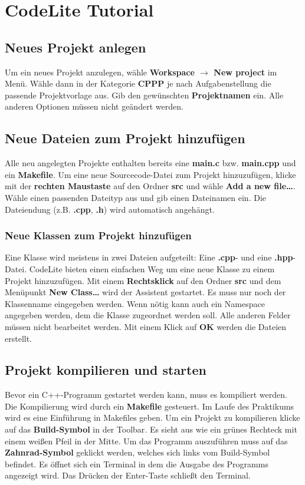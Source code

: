 \section{\ExercisePrefixAdditionalInformation CodeLite Tutorial}

\subsection{Neues Projekt anlegen}
Um ein neues Projekt anzulegen, wähle \textbf{Workspace $\rightarrow$ New project} im Menü. Wähle dann in der Kategorie \textbf{CPPP} je nach Aufgabenstellung die passende Projektvorlage aus.
Gib den gewünschten \textbf{Projektnamen} ein. Alle anderen Optionen müssen nicht geändert werden.

\subsection{Neue Dateien zum Projekt hinzufügen}
Alle neu angelegten Projekte enthalten bereits eine \textbf{main.c} bzw. \textbf{main.cpp} und ein \textbf{Makefile}.
Um eine neue Sourcecode-Datei zum Projekt hinzuzufügen, klicke mit der \textbf{rechten Maustaste} auf den Ordner \textbf{src} und wähle \textbf{Add a new file\dots}.
Wähle einen passenden Dateityp aus und gib einen Dateinamen ein.
Die Dateiendung (z.B. \textbf{.cpp}, \textbf{.h}) wird automatisch angehängt.

\subsubsection{Neue Klassen zum Projekt hinzufügen}
Eine Klasse wird meistens in zwei Dateien aufgeteilt: Eine \textbf{.cpp}- und eine \textbf{.hpp}-Datei. CodeLite bieten einen einfachen Weg um eine neue Klasse zu einem Projekt hinzuzufügen. Mit einem \textbf{Rechtsklick} auf den Ordner \textbf{src} und dem Menüpunkt \textbf{New Class\dots} wird der Assistent gestartet. Es muss nur noch der Klassenname eingegeben werden. Wenn nötig kann auch ein Namespace angegeben werden, dem die Klasse zugeordnet werden soll. Alle anderen Felder müssen nicht bearbeitet werden. Mit einem Klick auf \textbf{OK} werden die Dateien erstellt.


\subsection{Projekt kompilieren und starten}
Bevor ein C++-Programm gestartet werden kann, muss es kompiliert werden.
Die Kompilierung wird durch ein \textbf{Makefile} gesteuert. Im Laufe des Praktikums wird es eine Einführung in Makefiles geben.
Um ein Projekt zu kompilieren klicke auf das \textbf{Build-Symbol} in der Toolbar. Es sieht aus wie ein grünes Rechteck mit einem weißen Pfeil in der Mitte.
Um das Programm auszuführen muss auf das \textbf{Zahnrad-Symbol} geklickt werden, welches sich links vom Build-Symbol befindet. Es öffnet sich ein Terminal in dem die Ausgabe des Programms angezeigt wird. Das Drücken der Enter-Taste schließt den Terminal.


